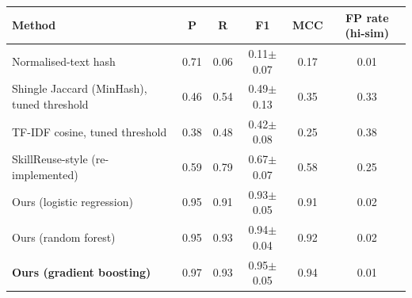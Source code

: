 \begin{tabular}{lccccc}
\toprule
Method & P & R & F1 & MCC & FP rate (hi-sim) \\
\midrule
Normalised-text hash & 0.71 & 0.06 & 0.11$\pm$0.07 & 0.17 & 0.01 \\
Shingle Jaccard (MinHash), tuned threshold & 0.46 & 0.54 & 0.49$\pm$0.13 & 0.35 & 0.33 \\
TF-IDF cosine, tuned threshold & 0.38 & 0.48 & 0.42$\pm$0.08 & 0.25 & 0.38 \\
SkillReuse-style (re-implemented) & 0.59 & 0.79 & 0.67$\pm$0.07 & 0.58 & 0.25 \\
\midrule
Ours (logistic regression) & 0.95 & 0.91 & 0.93$\pm$0.05 & 0.91 & 0.02 \\
Ours (random forest) & 0.95 & 0.93 & 0.94$\pm$0.04 & 0.92 & 0.02 \\
\textbf{Ours (gradient boosting)} & 0.97 & 0.93 & 0.95$\pm$0.05 & 0.94 & 0.01 \\
\bottomrule
\end{tabular}
